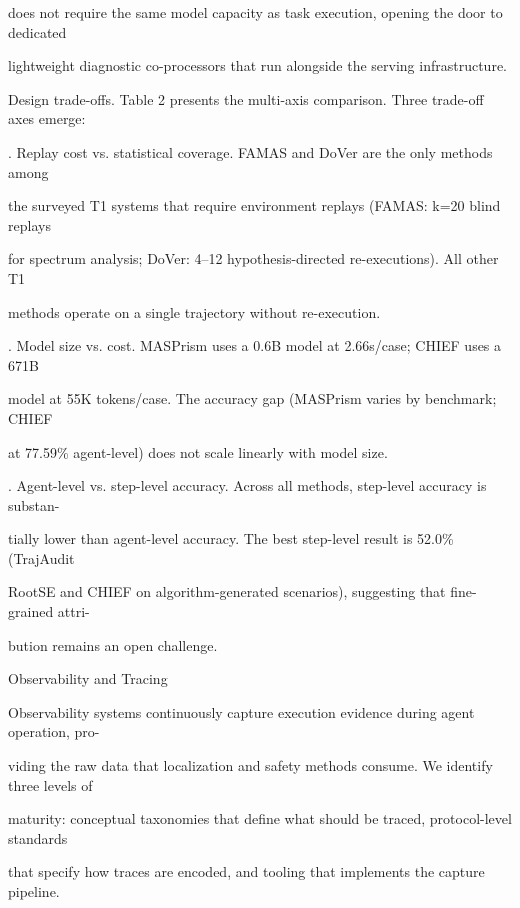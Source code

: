 \begin{flushleft}
\noindent does not require the same model capacity as task execution, opening the door to dedicated\par
\noindent lightweight diagnostic co-processors that run alongside the serving infrastructure.\par
\par\smallskip
\noindent Design trade-offs. Table 2 presents the multi-axis comparison. Three trade-off axes emerge:\par
{}. Replay cost vs. statistical coverage. FAMAS and DoVer are the only methods among\par
\noindent  the surveyed T1 systems that require environment replays (FAMAS: k=20 blind replays\par
\noindent  for spectrum analysis; DoVer: 4–12 hypothesis-directed re-executions). All other T1\par
\noindent  methods operate on a single trajectory without re-execution.\par
{}. Model size vs. cost. MASPrism uses a 0.6B model at 2.66s/case; CHIEF uses a 671B\par
\noindent  model at 55K tokens/case. The accuracy gap (MASPrism varies by benchmark; CHIEF\par
\noindent  at 77.59\% agent-level) does not scale linearly with model size.\par
{}. Agent-level vs. step-level accuracy. Across all methods, step-level accuracy is substan-\par
\noindent  tially lower than agent-level accuracy. The best step-level result is 52.0\% (TrajAudit\par
\noindent  RootSE and CHIEF on algorithm-generated scenarios), suggesting that fine-grained attri-\par
\noindent  bution remains an open challenge.\par
\par\smallskip
{} Observability and Tracing\par
\noindent Observability systems continuously capture execution evidence during agent operation, pro-\par
\noindent viding the raw data that localization and safety methods consume. We identify three levels of\par
\noindent maturity: conceptual taxonomies that define what should be traced, protocol-level standards\par
\noindent that specify how traces are encoded, and tooling that implements the capture pipeline.\par

\end{flushleft}
